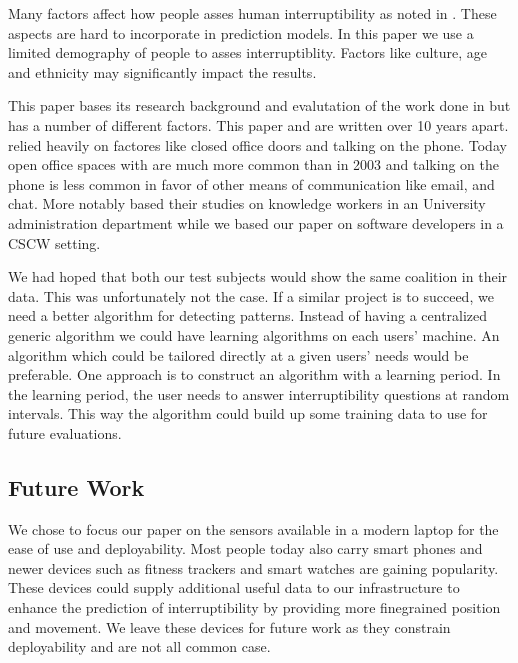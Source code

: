 \documentclass{sigchi}
\begin{document}

Many factors affect how people asses human interruptibility as noted in \cite{Avrahami2007}.
These aspects are hard to incorporate in prediction models.
In this paper we use a limited demography of people to asses interruptiblity.
Factors like culture, age and ethnicity may significantly impact the results.

This paper bases its research background and evalutation of the work done in \cite{fogarty2005predicting} but has a number of different factors. This paper and \cite{fogarty2005predicting} are written over 10 years apart. \cite{fogarty2005predicting} relied heavily on factores like closed office doors and talking on the phone. Today open office spaces with are much more common than in 2003 and talking on the phone is less common in favor of other means of communication like email, and chat. More notably \cite{fogarty2005predicting} based their studies on knowledge workers in an University administration department while we based our paper on software developers in a CSCW setting.

We had hoped that both our test subjects would show the same coalition in their data.
This was unfortunately not the case.
If a similar project is to succeed, we need a better algorithm for detecting patterns.
Instead of having a centralized generic algorithm we could have learning algorithms on each users’ machine.
An algorithm which could be tailored directly at a given users’ needs would be preferable.
One approach is to construct an algorithm with a learning period.
In the learning period, the user needs to answer interruptibility questions at random intervals.
This way the algorithm could build up some training data to use for future evaluations.

\subsection{Future Work}
We chose to focus our paper on the sensors available in a modern laptop for the ease of use and deployability.
Most people today also carry smart phones and newer devices such as fitness trackers and smart watches are gaining popularity.
These devices could supply additional useful data to our infrastructure to enhance the prediction of interruptibility by providing more finegrained position and movement.
We leave these devices for future work as they constrain deployability and are not all common case.
\end{document}
